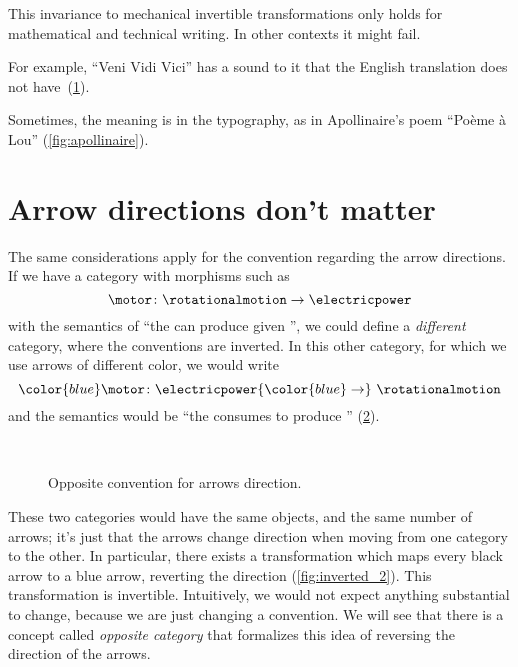 \vfill\clearpage
This invariance to mechanical invertible transformations only holds for mathematical and technical writing.
In other contexts it might fail.

For example, ``Veni Vidi Vici'' has a sound to it that the English translation does not have~(\cref{fig:vedividivici}).

\begin{figure}[h!]
    \centering
    \caption{}
    \label{fig:vedividivici}
\end{figure}

Sometimes, the meaning is in the typography, as in Apollinaire's poem ``Po\`eme \`a Lou'' (\cref{fig:apollinaire}).

\begin{figure*}[h!]
    \centering
    \caption{}
    \label{fig:apollinaire}
\end{figure*}

\section{Arrow directions don't matter}
The same considerations apply for the convention regarding the arrow directions.
If we have a category with morphisms such as
\begin{equation}
    \motor \colon \rotationalmotion \to \electricpower
\end{equation}
with the semantics of ``the \motor can produce \rotationalmotion given \electricpower'', we could define a \emph{different} category, where the conventions are inverted.
In this other category, for which we use arrows of different color, we would write
\begin{equation}
    {\color{blue}\motor}
    \colon \electricpower {\color{blue} \to}\  \rotationalmotion
\end{equation}
and the semantics would be ``the \motor consumes \electricpower to produce \rotationalmotion'' (\cref{fig:inverted}).

\begin{figure}[h!]
    \centering
    \\[+15pt]
    \caption{Opposite convention for arrows direction. }
    \label{fig:inverted}
\end{figure}

These two categories would have the same objects, and the same number of arrows; it's just that the arrows change direction when moving from one category to the other.
In particular, there exists a transformation which maps every black arrow to a blue arrow, reverting the direction (\cref{fig:inverted_2}).
This transformation is invertible.
Intuitively, we would not expect anything substantial to change, because we are just changing a convention.
We will see that there is a concept called \emph{opposite category} that formalizes this idea of reversing the direction of the arrows.

